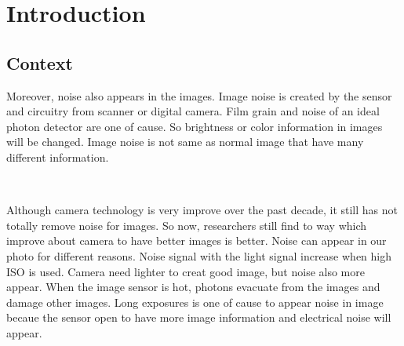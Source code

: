 \chapter{Introduction}






\section{Context}



Moreover, noise also appears in the images. Image noise is created by the sensor and
circuitry from scanner or digital camera. Film grain and noise of an ideal photon detector
are one of cause. So brightness or color information in images will be changed. Image noise is not same as normal image that have many different information.

\

Although camera technology is very improve over the past
decade, it still has not totally remove noise for images. So now, researchers still find to
way which improve about camera to have better images is better. Noise can appear in our
photo for different reasons. Noise signal with the light signal increase when high ISO is used.  Camera need lighter to creat good image, but noise also more appear. When the image sensor is hot, photons evacuate from the images and damage other images. Long exposures is one of cause to appear noise in image becaue the sensor open to have more image information and electrical noise will appear.

